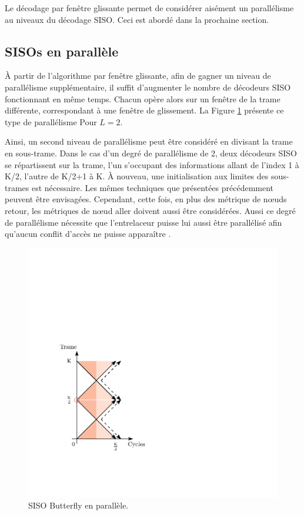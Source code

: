 Le décodage par fenêtre glissante permet de considérer aisément un parallélisme au niveaux du décodage SISO. Ceci est 
abordé dans la prochaine section.

\subsection{SISOs en parallèle}
À partir de l'algorithme par fenêtre glissante, afin de gagner un niveau de parallélisme supplémentaire, il suffit 
d'augmenter le nombre de décodeurs SISO fonctionnant en même temps. Chacun opère alors sur un fenêtre de la trame 
différente, correspondant à une fenêtre de glissement. La Figure \ref{fig:sisos_par} présente ce type de parallélisme 
Pour $L=2$.

Ainsi, un second niveau de parallélisme peut être considéré en divisant la trame en sous-trame. Dans le cas d'un degré de 
parallélisme de 2, deux décodeurs SISO se répartissent sur la trame, l'un s'occupant des informations allant de l'index
1 à K/2, l'autre de K/2+1 à K. À nouveau, une initialisation aux limites des sous-trames est nécessaire. Les mêmes 
techniques que présentées précédemment peuvent être envisagées. Cependant, cette fois, en plus des métrique de nœuds
retour, les métriques de nœud aller doivent aussi être considérées. Aussi ce degré de parallélisme nécessite que 
l'entrelaceur puisse lui aussi être parallélisé afin qu’aucun conflit d'accès ne puisse apparaître 
\cite{interleaver_conflict}. 

\begin{figure}[!h]
	\centering
	\includegraphics{main/ch4_fig/ipe/BFLY_SB.pdf}
	\caption{SISO Butterfly en parallèle. \label{fig:sisos_par}}
\end{figure}

